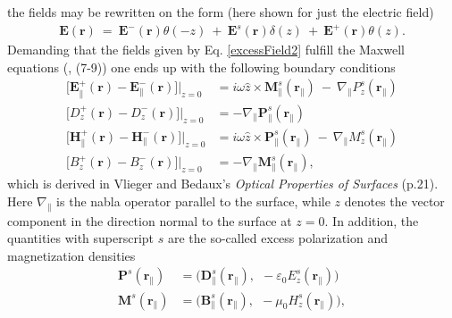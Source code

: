 the fields may be rewritten on the form (here shown for just the electric field)
%
\begin{align}
   \label{excessField2}
   \boldsymbol{E}(\boldsymbol{r}) \:=\: \boldsymbol{E}^-(\boldsymbol{r})\theta(-z) 
                                       \:+\: \boldsymbol{E}^s(\boldsymbol{r})\delta(z) 
                                       \:+\: \boldsymbol{E}^+(\boldsymbol{r})\theta(z).
\end{align}
%
Demanding that the fields given by Eq. \eqref{excessField2} fulfill the Maxwell equations 
(\cite{Lazzari2002}, (7-9)) one ends up with the following boundary conditions
%
\begin{subequations}
   \label{exFieldBC} %
\begin{align}
   \big[ \boldsymbol{E}^+_{\parallel} (\boldsymbol{r}) - \boldsymbol{E}^-_{\parallel} (\boldsymbol{r}) \big] \bigg\rvert _{z = 0} 
       &= i \omega \hat{z} \times \! \boldsymbol{M}^s_{\parallel}(\boldsymbol{r}_{\parallel}) \:-\: \nabla\!_{\parallel} P^s_{z}(\boldsymbol{r}_{\parallel}) 
       \label{exFieldBC1} \\ 
   \big[ D^+_{z} (\boldsymbol{r}) - D^-_{z} (\boldsymbol{r}) \big] \bigg\rvert _{z = 0} 
      &= - \nabla\!_{\parallel} \boldsymbol{P}^s_{\parallel}(\boldsymbol{r}_{\parallel}) 
      \label{exFieldBC2} \\ 
   \big[ \boldsymbol{H}^+_{\parallel} (\boldsymbol{r}) - \boldsymbol{H}^-_{\parallel} (\boldsymbol{r}) \big] \bigg\rvert _{z = 0} 
      &= i \omega \hat{z} \times \! \boldsymbol{P}^s_{\parallel}(\boldsymbol{r}_{\parallel}) \:-\: \nabla\!_{\parallel} M^s_{z}(\boldsymbol{r}_{\parallel})  
      \label{exFieldBC3} \\ 
   \big[ B^+_{z} (\boldsymbol{r}) - B^-_{z} (\boldsymbol{r}) \big] \bigg\rvert _{z = 0} 
      &= - \nabla\!_{\parallel} \boldsymbol{M}^s_{\parallel}(\boldsymbol{r}_{\parallel}), 
      \label{exFieldBC4}  
\end{align}
\end{subequations}
%
which is derived in Vlieger and Bedaux's \textit{Optical Properties of Surfaces} (p.21). 
Here $\nabla_{\parallel}$ is the nabla operator parallel to the surface, while $z$ denotes 
the vector component in the direction normal to the surface at $z = 0$.
In addition, the quantities with superscript $s$ are the so-called excess polarization 
and magnetization densities
\begin{subequations}
\label{surfQuant} %
\begin{align}
   \boldsymbol{P}^s(\boldsymbol{r}\!_{\parallel}) &= \big( \boldsymbol{D}^s_{\parallel}(\boldsymbol{r}\!_{\parallel}), \:\: - \varepsilon_0 E^s_{z}(\boldsymbol{r}\!_{\parallel}) \big) \label{surfQuant1}\\
   \boldsymbol{M}^s(\boldsymbol{r}\!_{\parallel}) &= \big( \boldsymbol{B}^s_{\parallel}(\boldsymbol{r}\!_{\parallel}), \:\: - \mu_0 H^s_{z}(\boldsymbol{r}\!_{\parallel}) \big) , \label{surfQuant2}
\end{align}
\end{subequations}
